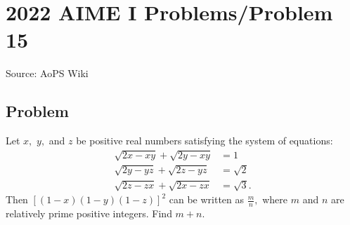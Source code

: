 \documentclass[12pt]{article}
\begin{document}
\section*{{2022 AIME I Problems/Problem 15}}
Source: AoPS Wiki

\subsection*{Problem}
Let $x,$ $y,$ and $z$ be positive real numbers satisfying the system of equations: \begin{align*} \sqrt{2x-xy} + \sqrt{2y-xy} &= 1 \\ \sqrt{2y-yz} + \sqrt{2z-yz} &= \sqrt2 \\ \sqrt{2z-zx} + \sqrt{2x-zx} &= \sqrt3. \end{align*} Then $\left[ (1-x)(1-y)(1-z) \right]^2$ can be written as $\frac{m}{n},$ where $m$ and $n$ are relatively prime positive integers. Find $m+n.$
\end{document}
